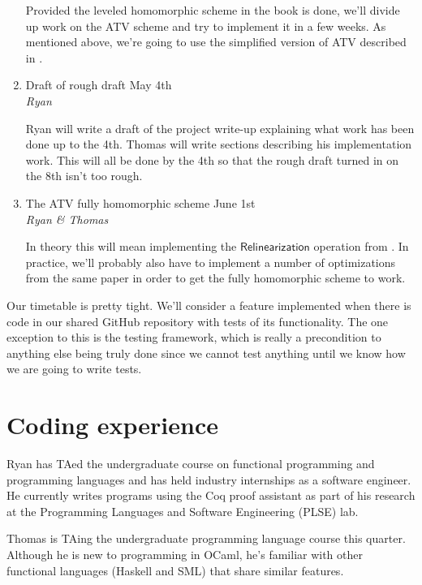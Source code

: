 \documentclass{article}
\begin{document}
\begin{enumerate}
Provided the leveled homomorphic scheme in the book is done, we'll divide up work on the ATV scheme and try to implement it in a few weeks. As mentioned above, we're going to use the simplified version of ATV described in \cite{DBLP:journals/iacr/DorozHS14}.

\item Draft of rough draft \dotfill May 4th \\
\emph{Ryan}

Ryan will write a draft of the project write-up explaining what work has been done up to the 4th. Thomas will write sections describing his implementation work. This will all be done by the 4th so that the rough draft turned in on the 8th isn't too rough.

\pagebreak
\item The ATV fully homomorphic scheme \dotfill June 1st \\
\emph{Ryan \& Thomas}

In theory this will mean implementing the \(\mathsf{Relinearization}\) operation from \cite{DBLP:journals/iacr/DorozHS14}. In practice, we'll probably also have to implement a number of optimizations from the same paper in order to get the fully homomorphic scheme to work.
\end{enumerate}
Our timetable is pretty tight. We'll consider a feature implemented when there is code in our shared GitHub repository with tests of its functionality. The one exception to this is the testing framework, which is really a precondition to anything else being truly done since we cannot test anything until we know how we are going to write tests. 

\section{Coding experience}
Ryan has TAed the undergraduate course on functional programming and programming languages and has held industry internships as a software engineer. He currently writes programs using the Coq proof assistant as part of his research at the Programming Languages and Software Engineering (PLSE) lab.

Thomas is TAing the undergraduate programming language course this quarter. Although he is new to programming in OCaml, he's familiar with other functional languages (Haskell and SML) that share similar features.
\printbibliography
\end{document}
